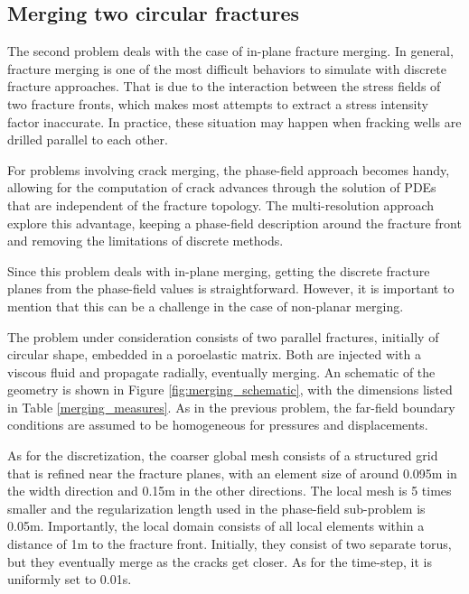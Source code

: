\FloatBarrier

\subsection{Merging two circular fractures}

The second problem deals with the case of in-plane fracture merging. In general, fracture merging is one of the most difficult behaviors to simulate with discrete fracture approaches. That is due to the interaction between the stress fields of two fracture fronts, which makes most attempts to extract a stress intensity factor inaccurate. In practice, these situation may happen when fracking wells are drilled parallel to each other. 

For problems involving crack merging, the phase-field approach becomes handy, allowing for the computation of crack advances through the solution of PDEs that are independent of the fracture topology.
The multi-resolution approach explore this advantage, keeping a phase-field description around the fracture front and removing the limitations of discrete methods.

Since this problem deals with in-plane merging, getting the discrete fracture planes from the phase-field values is straightforward. However, it is important to mention that this can be a challenge in the case of non-planar merging.

The problem under consideration consists of two parallel fractures, initially of circular shape, embedded in a poroelastic matrix. Both are injected with a viscous fluid and propagate radially, eventually merging. An schematic of the geometry is shown in Figure \ref{fig:merging_schematic}, with the dimensions listed in Table \ref{merging_measures}. As in the previous problem, the far-field boundary conditions are assumed to be homogeneous for pressures and displacements. 

As for the discretization, the coarser global mesh consists of a structured grid that is refined near the fracture planes, with an element size of around 0.095m in the width direction and 0.15m in the other directions. The local mesh is 5 times smaller and the regularization length used in the phase-field sub-problem is 0.05m. Importantly, the local domain consists of all local elements within a distance of 1m to the fracture front. Initially, they consist of two separate torus, but they eventually merge as the cracks get closer. As for the time-step, it is uniformly set to 0.01s.

